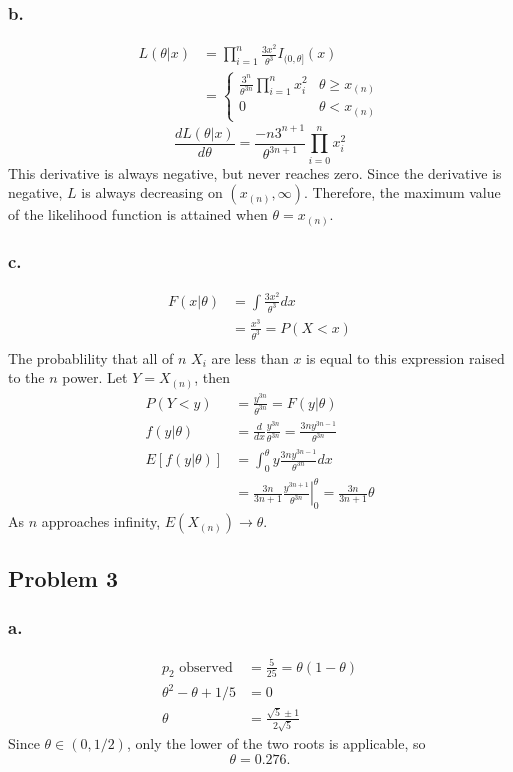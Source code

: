 \documentclass{article}
\begin{document}
\subsubsection*{b.}
\begin{align*}
L(\theta|x) &= \prod_{i=1}^n\frac{3x^2}{\theta^3}I_{(0,\theta]}(x) \\
&=\begin{cases} \frac{3^n}{\theta^{3n}}\prod_{i=1}^n x_i^2 & \theta \geq x_{(n)} \\ 0 & \theta < x_{(n)} \end{cases}
\end{align*}
\[\frac{dL(\theta|x)}{d\theta} = \frac{-n3^{n+1}}{\theta^{3n+1}}\prod_{i=0}^n x_i^2\]
This derivative is always negative, but never reaches zero. Since the derivative is negative, $L$ is always decreasing on $(x_{(n)}, \infty)$. Therefore, the maximum value of the likelihood function is attained when $\theta = x_{(n)}$.
\subsubsection*{c.}
\begin{align*}
F(x|\theta) &= \int \frac{3x^2}{\theta^3}dx \\
&= \frac{x^3}{\theta^3} = P(X < x) \\
\end{align*}
The probablility that all of $n$ $X_i$ are less than $x$ is equal to this expression raised to the $n$ power. Let $Y = X_{(n)}$, then 
\begin{align*}
P(Y < y) &= \frac{y^{3n}}{\theta^{3n}} = F(y|\theta) \\
f(y|\theta) &= \frac{d}{dx}\frac{y^{3n}}{\theta^{3n}} = \frac{3ny^{3n-1}}{\theta^{3n}} \\
E\left[f(y|\theta)\right] &= \int_0^\theta y\frac{3ny^{3n-1}}{\theta^{3n}}dx \\
&= \frac{3n}{3n+1}\left.\frac{y^{3n+1}}{\theta^{3n}}\right|^\theta_0 = \frac{3n}{3n+1}\theta
\end{align*}
As $n$ approaches infinity, $E(X_{(n)}) \to \theta$. 

\subsection*{Problem 3}
\subsubsection{a.}
\begin{align*} 
p_2 \text{  observed} &= \frac{5}{25} = \theta(1-\theta) \\
\theta^2 - \theta +1/5 &= 0 \\
\theta &= \frac{\sqrt{5} \pm 1}{2\sqrt{5}}
\end{align*}
Since $\theta \in (0, 1/2)$, only the lower of the two roots is applicable, so \[\theta = 0.276.\]
\end{document}
